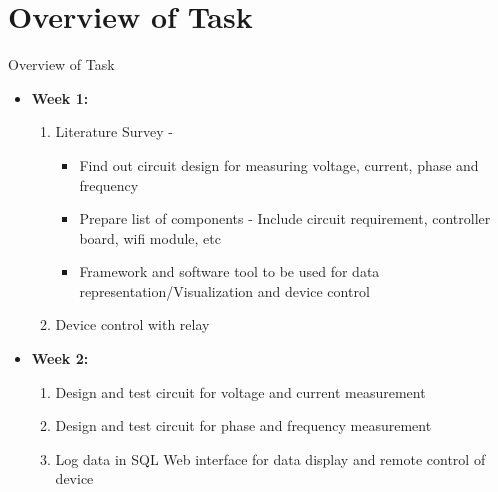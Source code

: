 \documentclass[10pt, a4paper]{beamer}
\begin{document}
\section{Overview of Task}
\begin{frame}{Overview of Task}
	\begin{itemize}
		\item \textbf {Week 1:}
		\begin{enumerate}
			\item Literature Survey - 
			\begin{itemize}
				\item Find out circuit design for measuring voltage, current, phase and frequency
				\item Prepare list of components - Include circuit requirement, controller board, wifi module, etc
				\item Framework and software tool to be used for data representation/Visualization and device control
			\end{itemize}
			\item Device control with relay
		\end{enumerate}
		\item \textbf{Week 2:}
		\begin{enumerate}
			\item Design and test circuit for voltage and current measurement
			\item Design and test circuit for phase and frequency measurement
			\item Log data in SQL Web interface for data display and remote control of device 
		\end{enumerate}
	\end{itemize}
\end{frame}
\end{document}
